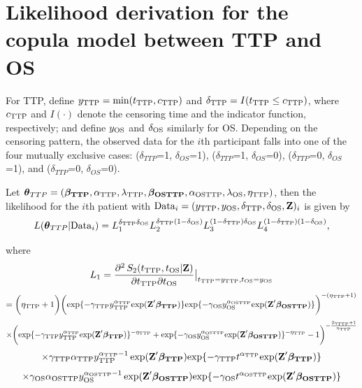 \documentclass[12pt]{article}
\begin{document}
\newpage
\section{Likelihood derivation for the copula model between TTP and OS}
For TTP,
define $y_{\rm TTP}=\mathrm{min}(t_{\rm TTP}, c_{\rm TTP})$ and
$\delta_{\rm TTP}=I(t_{\rm TTP} \le c_{\rm TTP})$,
where $c_{\rm TTP}$ and $I(\cdot)$ denote the censoring time and the indicator function,
respectively; and define $y_{\rm OS}$ and $\delta_{\rm OS}$ similarly for OS. Depending on the censoring pattern, the observed data for the $i$th participant falls into one of the four mutually exclusive cases: ($\delta_{TTP}$=1, $\delta_{OS}$=1), ($\delta_{TTP}$=1, $\delta_{OS}$=0),
($\delta_{TTP}$=0, $\delta_{OS}$=1), and ($\delta_{TTP}$=0, $\delta_{OS}$=0). 

Let
$\boldsymbol{\theta}_{TTP}=(\boldsymbol{\beta_{\rm TTP}}, \alpha_{\rm TTP}, \lambda_{\rm TTP}, \boldsymbol{\beta_{\rm OSTTP}},
\alpha_{\rm OSTTP}, \lambda_{\rm OS}, \eta_{\rm TTP})$,  then the
likelihood for the $i$th patient with ${\rm Data}_i=(y_{\rm TTP}, y_{\rm OS},
\delta_{\rm TTP}, \delta_{\rm OS}, \textbf{Z})_i$ is given by
$$
L(\boldsymbol{\theta}_{TTP}|{\rm Data}_i)
=L_1^{\delta_{\rm TTP}\delta_{\rm OS}}
L_2^{\delta_{\rm TTP}(1-\delta_{\rm OS})}L_3^{(1-\delta_{\rm TTP})\delta_{\rm OS}}
L_4^{(1-\delta_{\rm TTP})(1-\delta_{\rm OS})},
$$

where
$$
L_1=\frac{\partial^2\, S_2(t_{\rm TTP}, t_{\rm OS}|\textbf{Z})}{\partial t_{\rm TTP} \partial t_{\rm OS}}\big|_{t_{\rm TTP}=y_{\rm TTP},t_{\rm OS}=y_{\rm OS}}
$$
$$
=\bigg(\eta_{\rm TTP}+1\bigg)\bigg(\mathrm{exp}\{-\gamma_{\rm TTP} y_{\rm TTP}^{\alpha_{\rm TTP}}
\mathrm{exp}(\textbf{Z}' \boldsymbol{\beta_{\rm TTP}} )\} \mathrm{exp}\{-\gamma_{\rm OS} y_{\rm OS}^{\alpha_{\rm OSTTP}}
\mathrm{exp}(\textbf{Z}' \boldsymbol{\beta_{\rm OSTTP}} )\}\bigg)^{-(\eta_{\rm TTP}+1)}
$$
$$
\times \bigg(\mathrm{exp}\{-\gamma_{\rm TTP} y_{\rm TTP}^{\alpha_{\rm TTP}}
\mathrm{exp}(\textbf{Z}' \boldsymbol{\beta_{\rm TTP}} )\}^{-\eta_{\rm TTP}}+\mathrm{exp}\{-\gamma_{\rm OS} y_{\rm OS}^{\alpha_{\rm OSTTP}}
\mathrm{exp}(\textbf{Z}' \boldsymbol{\beta_{\rm OSTTP}} )\}^{-\eta_{\rm TTP}}-1\bigg)^{-\frac{2\eta_{\rm TTP}+1}{\eta_{\rm TTP}}}
$$
$$
\times \gamma_{\rm TTP} \alpha_{\rm TTP} y_{\rm TTP}^{{\alpha_{\rm TTP} -1}} \exp(\textbf{Z}' \boldsymbol{\beta_{\rm TTP}}) \mathrm{exp}\{-\gamma_{\rm TTP} t^{\alpha_{\rm TTP}}
\mathrm{exp}(\textbf{Z}' \boldsymbol{\beta_{\rm TTP}} )\}
$$
$$
\times \gamma_{\rm OS} \alpha_{\rm OSTTP} y_{\rm OS}^{{\alpha_{\rm OSTTP} -1}} \exp(\textbf{Z}' \boldsymbol{\beta_{\rm OSTTP}}) \mathrm{exp}\{-\gamma_{\rm OS} t^{\alpha_{\rm OSTTP}}
\mathrm{exp}(\textbf{Z}' \boldsymbol{\beta_{\rm OSTTP}} )\}
$$
\end{document}
